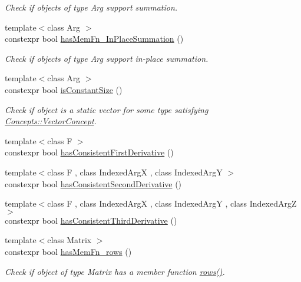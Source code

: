 \begin{DoxyCompactItemize}
\begin{DoxyCompactList}\small\item\em Check if objects of type Arg support summation. \end{DoxyCompactList}\item 
{\footnotesize template$<$class Arg $>$ }\\constexpr bool \hyperlink{namespaceFunG_1_1Checks_a5357edca3d0fdcfbc1fba5fd43713b40}{has\+Mem\+Fn\+\_\+\+In\+Place\+Summation} ()
\begin{DoxyCompactList}\small\item\em Check if objects of type Arg support in-\/place summation. \end{DoxyCompactList}\item 
{\footnotesize template$<$class Arg $>$ }\\constexpr bool \hyperlink{namespaceFunG_1_1Checks_adcc3e179af2ed0384a3773ea086045b9}{is\+Constant\+Size} ()
\begin{DoxyCompactList}\small\item\em Check if object is a static vector for some type satisfying \hyperlink{structFunG_1_1Concepts_1_1VectorConcept}{Concepts\+::\+Vector\+Concept}. \end{DoxyCompactList}\item 
{\footnotesize template$<$class F $>$ }\\constexpr bool \hyperlink{namespaceFunG_1_1Checks_a5f9a3a474205df6f565dd1a03ebb5e28}{has\+Consistent\+First\+Derivative} ()
\item 
{\footnotesize template$<$class F , class Indexed\+Arg\+X , class Indexed\+Arg\+Y $>$ }\\constexpr bool \hyperlink{namespaceFunG_1_1Checks_a072e2c21fa90be998a34975fb2975772}{has\+Consistent\+Second\+Derivative} ()
\item 
{\footnotesize template$<$class F , class Indexed\+Arg\+X , class Indexed\+Arg\+Y , class Indexed\+Arg\+Z $>$ }\\constexpr bool \hyperlink{namespaceFunG_1_1Checks_aad092e45db1d0c1d7b6f69a5562679fa}{has\+Consistent\+Third\+Derivative} ()
\item 
{\footnotesize template$<$class Matrix $>$ }\\constexpr bool \hyperlink{namespaceFunG_1_1Checks_a68fd30eff9d106c399b2b0e9a1f1b822}{has\+Mem\+Fn\+\_\+rows} ()
\begin{DoxyCompactList}\small\item\em Check if object of type Matrix has a member function \hyperlink{namespaceFunG_1_1LinearAlgebra_abd3afa2fcd2194787342b2662cfa9f5a}{rows()}. \end{DoxyCompactList}\item 

\end{DoxyCompactItemize}
